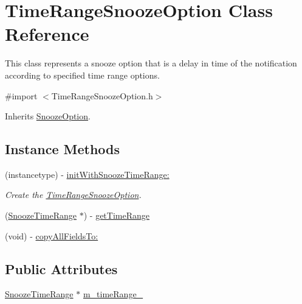 \hypertarget{interface_time_range_snooze_option}{}\section{Time\+Range\+Snooze\+Option Class Reference}
\label{interface_time_range_snooze_option}


This class represents a snooze option that is a delay in time of the notification according to specified time range options.  




{\ttfamily \#import $<$Time\+Range\+Snooze\+Option.\+h$>$}



Inherits \hyperlink{interface_snooze_option}{Snooze\+Option}.

\subsection*{Instance Methods}
\begin{DoxyCompactItemize}
\item 
(instancetype) -\/ \hyperlink{interface_time_range_snooze_option_ab4299a3ecca28a3eb75a2d7f97aaff6d}{init\+With\+Snooze\+Time\+Range\+:}
\begin{DoxyCompactList}\small\item\em Create the \hyperlink{interface_time_range_snooze_option}{Time\+Range\+Snooze\+Option}. \end{DoxyCompactList}\item 
(\hyperlink{interface_snooze_time_range}{Snooze\+Time\+Range} $\ast$) -\/ \hyperlink{interface_time_range_snooze_option_a9a048cc27be8fa005b2ed4d62e3f17ed}{get\+Time\+Range}
\item 
(void) -\/ \hyperlink{interface_time_range_snooze_option_ac8f67f222467a357432417797125c269}{copy\+All\+Fields\+To\+:}
\end{DoxyCompactItemize}
\subsection*{Public Attributes}
\begin{DoxyCompactItemize}
\item 
\hyperlink{interface_snooze_time_range}{Snooze\+Time\+Range} $\ast$ \hyperlink{interface_time_range_snooze_option_a7ca4bac73a05dd0f4b602aa52a0e83b0}{m\+\_\+time\+Range\+\_\+}
\end{DoxyCompactItemize}


